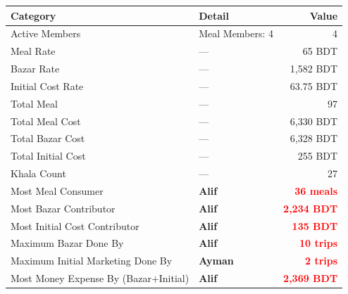 \documentclass{article}
\begin{document}
\begin{table}[h]
\centering
\large
\renewcommand{\arraystretch}{1.6}
\begin{tabular}{llr}
\toprule
\rowcolor{blue!20}
\textbf{Category} & \textbf{Detail} & \textbf{Value} \\
\midrule
\rowcolor{gray!10}
Active Members              & Meal Members: 4 & 4 \\
\rowcolor{white}
Meal Rate                   & ---    & 65 BDT \\
\rowcolor{gray!10}
Bazar Rate                  & ---    & 1,582 BDT \\
\rowcolor{white}
Initial Cost Rate           & ---    & 63.75 BDT \\
\rowcolor{gray!10}
Total Meal                  & ---    & 97 \\
\rowcolor{white}
Total Meal Cost             & ---    & 6,330 BDT \\
\rowcolor{gray!10}
Total Bazar Cost            & ---    & 6,328 BDT \\
\rowcolor{white}
Total Initial Cost          & ---    & 255 BDT \\
\rowcolor{gray!10}
Khala Count                 & ---    & 27 \\
\midrule
\rowcolor{red!20}
Most Meal Consumer          & \textcolor{BrightGreen}{\textbf{Alif}} & \textcolor{red}{\textbf{36 meals}} \\
\rowcolor{white}
Most Bazar Contributor      & \textcolor{BrightGreen}{\textbf{Alif}} & \textcolor{red}{\textbf{2,234 BDT}} \\
\rowcolor{red!20}
Most Initial Cost Contributor & \textcolor{BrightGreen}{\textbf{Alif}} & \textcolor{red}{\textbf{135 BDT}} \\
\rowcolor{white}
Maximum Bazar Done By       & \textcolor{BrightGreen}{\textbf{Alif}} & \textcolor{red}{\textbf{10 trips}} \\
\rowcolor{red!20}
Maximum Initial Marketing Done By & \textcolor{BrightGreen}{\textbf{Ayman}} & \textcolor{red}{\textbf{2 trips}} \\
\rowcolor{white}
Most Money Expense By (Bazar+Initial) & \textcolor{BrightGreen}{\textbf{Alif}} & \textcolor{red}{\textbf{2,369 BDT}} \\
\bottomrule
\end{tabular}
\end{table}
\end{document}
